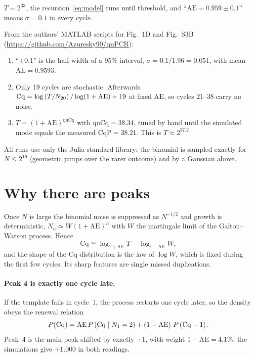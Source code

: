 \documentclass[11pt]{article}
\newcommand{\AEf}{\mathrm{AE}}
\newcommand{\Cq}{\mathrm{Cq}}
\begin{document}
\begin{definition}
$T=2^{38}$, the recursion~\eqref{eq:model} runs until threshold, and ``$\AEf=0.959\pm0.1$'' means
$\sigma=0.1$ in every cycle.
\end{definition}

\begin{definition}
From the authors' MATLAB scripts for Fig.~1D and Fig.~S3B
(\url{https://github.com/Azuresky99/quPCR}):
\begin{enumerate}
    \item ``$\pm0.1$'' is the half-width of a 95\% interval, $\sigma=0.1/1.96=0.051$, with mean
          $\AEf=0.9593$.
    \item Only 19 cycles are stochastic. Afterwards
          $\Cq=\log\p{T/N_{20}}/\log(1+\AEf)+19$ at fixed $\AEf$, so cycles 21--38 carry no noise.
    \item $T=(1+\AEf)^{\mathrm{quCq}}$ with $\mathrm{quCq}=38.34$, tuned by hand until the
          simulated mode equals the measured $\mathrm{CqP}=38.21$. This is $T\approx2^{37.2}$.
\end{enumerate}
\end{definition}

All runs use only the Julia standard library: the binomial is sampled exactly for
$N\le2^{16}$ (geometric jumps over the rarer outcome) and by a Gaussian above.

\section{Why there are peaks}

Once $N$ is large the binomial noise is suppressed as $N^{-1/2}$ and growth is deterministic,
$N_n\simeq W(1+\AEf)^n$ with $W$ the martingale limit of the Galton--Watson process. Hence
\begin{equation}
    \Cq \simeq \log_{1+\AEf}T - \log_{1+\AEf}W ,
\end{equation}
and the shape of the Cq distribution is the law of $\log W$, which is fixed during the first
few cycles. Its sharp features are single missed duplications.

\paragraph{Peak 4 is exactly one cycle late.} If the template fails in cycle~1, the process
restarts one cycle later, so the density obeys the renewal relation
\begin{equation}
    P(\Cq) = \AEf\,P\p{\Cq \mid N_1=2} + \p{1-\AEf}\,P\p{\Cq-1}.
\end{equation}
Peak~4 is the main peak shifted by exactly $+1$, with weight $1-\AEf=4.1\%$; the simulations
give $+1.000$ in both readings.
\end{document}
